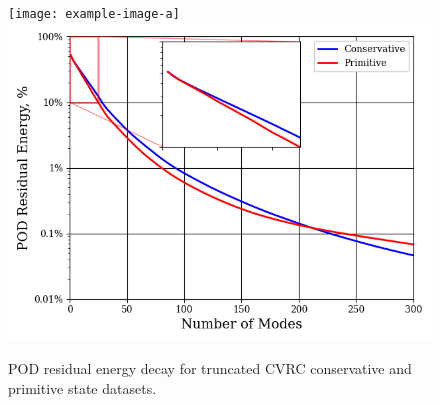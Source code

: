 \begin{figure}
	\centering
	\ifdefined\DRAFT
		\texttt{[image: example-image-a]}
	\else
		\includegraphics[width=0.8\linewidth]{Chapters/CavityAndCVRC/Images/cvrc/cvrc_pod_energy_10ms.png}
	\fi
	\caption{\label{fig:cvrcPODEnergy}POD residual energy decay for truncated CVRC conservative and primitive state datasets.}
\end{figure}


